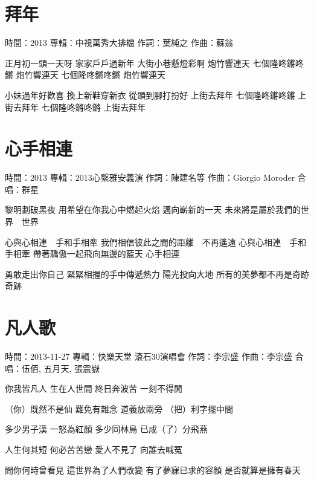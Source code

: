 \documentclass[UTF8,a4paper,oneside,twocolumn,12pt]{ctexbook}
\newcommand{\infopair}[2]{\textbullet #1：#2}
\newcommand{\zc}[1][伍佰]{\infopair{作詞}{#1}}
\newcommand{\zq}[1][伍佰]{\infopair{作曲}{#1}}
\newcommand{\zj}[1]{\infopair{專輯}{#1}}
\newcommand{\sj}[1]{\infopair{時間}{#1}}
\newenvironment{info}{\begin{flushleft}\kaishu
	}
	{\end{flushleft}\normalsize\yahei\par}
\newenvironment{lyric}{
	}
{}
\begin{document}
\section{拜年} %
\begin{info}
	\sj{2013}
	\zj{中視萬秀大排檔}
	\zc[葉純之]
	\zq[蘇翁]
\end{info}
\begin{lyric}
	正月初一頭一天呀 家家戶戶過新年
	大街小巷懸燈彩啊 炮竹響連天
	七個隆咚鏘咚鏘 炮竹響連天
	七個隆咚鏘咚鏘 炮竹響連天

	小妹過年好歡喜 換上新鞋穿新衣
	從頭到腳打扮好 上街去拜年
	七個隆咚鏘咚鏘 上街去拜年
	七個隆咚鏘咚鏘 上街去拜年
\end{lyric}

\section{心手相連}
\begin{info}
	\sj{2013}
	\zj{2013心繫雅安義演}
	\zc[陳建名等]
	\zq[Giorgio Moroder]
	\infopair{合唱}{群星}
\end{info}
\begin{lyric}
	黎明劃破黑夜
	用希望在你我心中燃起火焰
	邁向嶄新的一天
	未來將是屬於我們的世界　世界

	心與心相連　手和手相牽
	我們相信彼此之間的距離　不再遙遠
	心與心相連　手和手相牽
	帶著驕傲一起飛向無邊的藍天
	心手相連

	勇敢走出你自己
	緊緊相握的手中傳遞熱力
	陽光投向大地
	所有的美夢都不再是奇跡　奇跡
\end{lyric}

\section{凡人歌}
\begin{info}
	\sj{2013-11-27}
	\zj{快樂天堂 滾石30演唱會}
	\zc[李宗盛]
	\zq[李宗盛]
	\infopair{合唱}{伍佰, 五月天, 張震嶽}
\end{info}
\begin{lyric}
	你我皆凡人  生在人世間
	終日奔波苦  一刻不得閒

	（你）既然不是仙  難免有雜念
	道義放兩旁  （把）利字擺中間

	多少男子漢  一怒為紅顏
	多少同林鳥  已成（了）分飛燕

	人生何其短  何必苦苦戀
	愛人不見了  向誰去喊冤

	問你何時曾看見  這世界為了人們改變
	有了夢寐已求的容顏  是否就算是擁有春天
\end{lyric}
\end{document}
